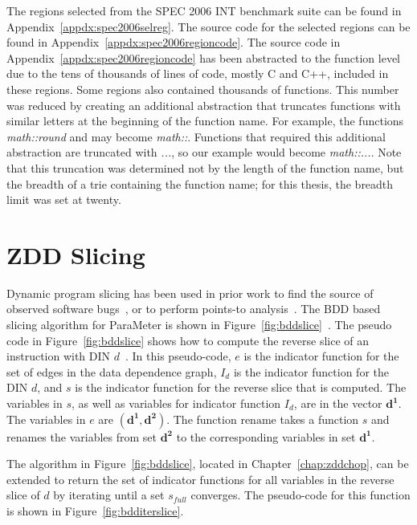 \documentclass[defaultstyle,11pt]{thesis}
\begin{document}
The regions selected from the SPEC 2006 INT benchmark suite can be
found in Appendix~\ref{appdx:spec2006selreg}.  The source code for the
selected regions can be found in
Appendix~\ref{appdx:spec2006regioncode}.  The source code in
Appendix~\ref{appdx:spec2006regioncode} has been abstracted to the
function level due to the tens of thousands of lines of code, mostly C
and C++, included in these regions.  Some regions also contained
thousands of functions.  This number was reduced by creating an
additional abstraction that truncates functions with similar letters
at the beginning of the function name.  For example, the functions
\textit{math::round} and  may become \textit{math::}.
Functions that required this additional abstraction are truncated with
\textit{...}, so our example would become \textit{math::...}. Note
that this truncation was determined not by the length of the function
name, but the breadth of a trie containing the function name; for this
thesis, the breadth limit was set at twenty.

\section{ZDD Slicing}
\label{sec:slicing}

Dynamic program slicing has been used in prior work to find the source
of observed software
bugs~\cite{gallager:91:se,agrawal:90:pldi,agrawal:92:thesis}, or to
perform points-to analysis~\cite{lhotak:08:lcpc}. The BDD based slicing algorithm for ParaMeter is shown in
Figure~\ref{fig:bddslice}~\cite{price:06:cal}. The pseudo code in
Figure~\ref{fig:bddslice} shows how to compute the reverse slice of an
instruction with DIN $d$~\cite{price:06:cal}. In this pseudo-code, $e$
is the indicator function for the set of edges in the data dependence
graph, $I_d$ is the indicator function for the DIN $d$, and $s$ is the
indicator function for the reverse slice that is computed.  The
variables in $s$, as well as variables for indicator function $I_d$,
are in the vector $\mathbf{d^1}$. The variables in $e$ are
$(\mathbf{d^1},\mathbf{d^2})$.  The function $\mathrm{rename}$ takes a
function $s$ and renames the variables from set $\mathbf{d^2}$ to the
corresponding variables in set $\mathbf{d^1}$.

The algorithm in Figure~\ref{fig:bddslice}, located in
Chapter~\ref{chap:zddchop}, can be extended to return the set of
indicator functions for all variables in the reverse slice of $d$ by
iterating until a set $s_{full}$ converges.  The pseudo-code for this
function is shown in Figure~\ref{fig:bdditerslice}.
\end{document}
